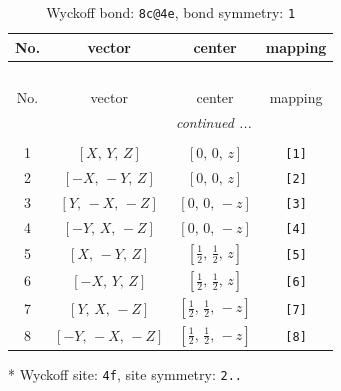 \documentclass[fleqn,8pt]{jsarticle}
\begin{document}
\renewcommand{\arraystretch}{1.2}
\begin{longtable}{cccc}
\caption{Wyckoff bond: {\tt 8c@4e}, bond symmetry: {\tt 1}}
 \\
 \hline \hline
No. & vector & center & mapping \\ \hline \endfirsthead

\multicolumn{3}{l}{\tablename\ \thetable{}} \\
 \hline \hline
No. & vector & center & mapping \\ \hline \endhead

 \hline \hline
\multicolumn{3}{r}{\footnotesize\it continued ...} \\ \endfoot

 \hline \hline
\multicolumn{3}{r}{} \\ \endlastfoot

1 & $\left[ X,\, Y,\, Z \right]$ & $\left[ 0,\, 0,\, z \right]$ & {\tt [1]} \\ \hline
2 & $\left[ - X,\, - Y,\, Z \right]$ & $\left[ 0,\, 0,\, z \right]$ & {\tt [2]} \\ \hline
3 & $\left[ Y,\, - X,\, - Z \right]$ & $\left[ 0,\, 0,\, - z \right]$ & {\tt [3]} \\ \hline
4 & $\left[ - Y,\, X,\, - Z \right]$ & $\left[ 0,\, 0,\, - z \right]$ & {\tt [4]} \\ \hline
5 & $\left[ X,\, - Y,\, Z \right]$ & $\left[ \frac{1}{2},\, \frac{1}{2},\, z \right]$ & {\tt [5]} \\ \hline
6 & $\left[ - X,\, Y,\, Z \right]$ & $\left[ \frac{1}{2},\, \frac{1}{2},\, z \right]$ & {\tt [6]} \\ \hline
7 & $\left[ Y,\, X,\, - Z \right]$ & $\left[ \frac{1}{2},\, \frac{1}{2},\, - z \right]$ & {\tt [7]} \\ \hline
8 & $\left[ - Y,\, - X,\, - Z \right]$ & $\left[ \frac{1}{2},\, \frac{1}{2},\, - z \right]$ & {\tt [8]} \\
\end{longtable}
* Wyckoff site: {\tt 4f}, site symmetry: {\tt 2..}
\renewcommand{\arraystretch}{1.2}
\end{document}
